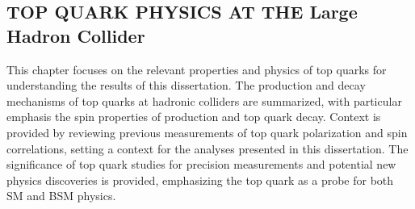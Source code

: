 \begin{refsection}

\chapter{TOP QUARK PHYSICS AT THE Large Hadron Collider}
\label{Top_Quark_Physics_at_the_LHC}

\begin{cabstract}
This chapter focuses on the relevant properties and physics of top quarks for understanding the results of this dissertation. 
The production and decay mechanisms of top quarks at hadronic colliders are summarized, with particular emphasis the spin properties of \ttbar production and top quark decay. 
Context is provided by reviewing previous measurements of top quark polarization and \ttbar spin correlations, setting a context for the analyses presented in this dissertation. 
The significance of top quark studies for precision measurements and potential new physics discoveries is provided, emphasizing the top quark as a probe for both SM and BSM physics.
\end{cabstract}


\end{refsection}
